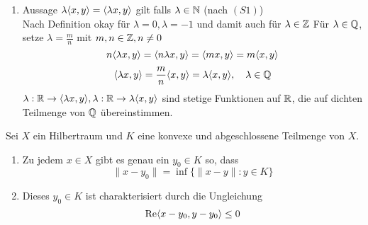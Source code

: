 \begin{beweis}
\begin{enumerate}[label=\roman*\upshape)]
		\item Aussage $\lambda \langle x, y \rangle = \langle \lambda x, y \rangle$ gilt falls $\lambda \in \mathbb{N}$ (nach \hyperref[def:15.1i]{$(S1)$}) \\
			Nach Definition okay für $\lambda = 0, \lambda = -1$ und damit auch für $\lambda \in \mathbb{Z}$
			Für $\lambda \in \mathbb{Q}$, setze $\lambda = \frac{m}{n}$ mit $m, n \in \mathbb{Z}, n \neq 0$ 
			\[ n \langle \lambda x, y \rangle = \langle n \lambda x, y \rangle = \langle m x, y \rangle = m \langle x, y \rangle \]
			\[ \langle \lambda x, y \rangle = \frac{m}{n} \langle x, y \rangle = \lambda \langle x, y \rangle, \quad \lambda \in \mathbb{Q} \]
			$\lambda : \mathbb{R} \rightarrow \langle \lambda x, y \rangle, \lambda : \mathbb{R} \rightarrow \lambda \langle x, y \rangle$ sind stetige Funktionen auf $\mathbb{R}$, die auf dichten Teilmenge von $\mathbb{Q}$ übereinstimmen.
	\end{enumerate}
\end{beweis}


\begin{satz} \label{satz:15.7-besteApproximation} 
	Sei $X$ ein Hilbertraum und $K$ eine konvexe und abgeschlossene Teilmenge von $X$.
	\begin{enumerate}[label=\alph*\upshape)]
		\item Zu jedem $x \in X$ gibt es genau ein $y_{0} \in K$ so, dass
			\[ \| x - y_{0} \| = \inf \{ \| x - y \|: y \in K \} \]
		\item Dieses $y_{0} \in K$ ist charakterisiert durch die Ungleichung 
			\[ \mathop{\rm Re}\nolimits \langle x - y_{0}, y - y_{0} \rangle \leq 0 \]
	\end{enumerate}
\end{satz}

